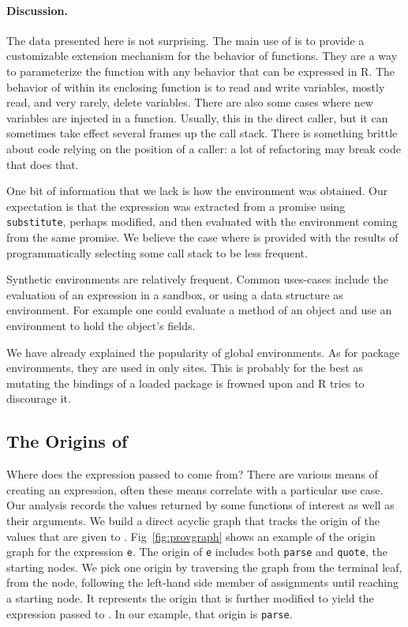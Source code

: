 \documentclass[acmsmall, screen]{acmart}
\renewcommand{\k}[1]{\lstinline |#1|\xspace}
\begin{document}
\paragraph{Discussion.}
The data presented here is not surprising. The main use of \eval is to provide a
customizable extension mechanism for the behavior of functions. They are a way
to parameterize the function with any behavior that can be expressed in R. The
behavior of \eval within its enclosing function is to read and write variables,
mostly read, and very rarely, delete variables. There are also some cases where
new variables are injected in a function. Usually, this in the direct caller,
but it can sometimes take effect several frames up the call stack. There is
something brittle about code relying on the position of a caller: a lot of
refactoring may break code that does that.

One bit of information that we lack is how the environment was obtained. Our
expectation is that the expression was extracted from a promise using
\k{substitute}, perhaps modified, and then evaluated with the environment coming
from the same promise. We believe the case where \eval is provided with the results
of programmatically selecting some call stack to be less frequent.

Synthetic environments are relatively frequent. Common uses-cases include
the evaluation of an expression in a sandbox, or using a data structure as
environment. For example one could evaluate a method of an object and use an
environment to hold the object's fields.

We have already explained the popularity of global environments. As for package
environments, they are used in only \packageNbPackageNamespaceEnvSites sites.
This is probably for the best as mutating the bindings of a loaded package is
frowned upon and R tries to discourage it.

\subsection{The Origins of \Eval}

Where does the expression passed to \eval come from? There are various means of
creating an expression, often these means correlate with a particular use case.
Our analysis records the values returned by some functions of interest as well
as their arguments. We build a direct acyclic graph that tracks the origin
of the values that are given to \eval. Fig~\ref{fig:provgraph} shows an example
of the origin graph for the expression \k{e}.
The origin of \k{e} includes both \k{parse} and \k{quote}, the starting nodes. We pick one origin by traversing the graph from the terminal leaf, \ie from the \eval node, following the left-hand side
member of assignments until reaching a starting node. It represents the origin that is
further modified to yield the expression passed to \eval. In our example, that
origin is \k{parse}.
\end{document}
